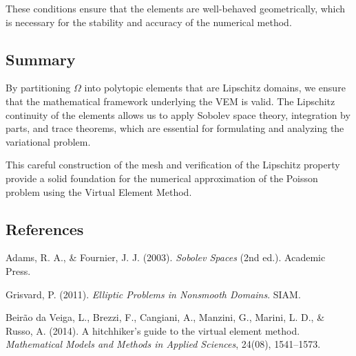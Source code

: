 \documentclass{article}
\begin{document}
These conditions ensure that the elements are well-behaved geometrically, which is necessary for the stability and accuracy of the numerical method.

\subsection{Summary}

By partitioning \( \Omega \) into polytopic elements that are Lipschitz domains, we ensure that the mathematical framework underlying the VEM is valid. The Lipschitz continuity of the elements allows us to apply Sobolev space theory, integration by parts, and trace theorems, which are essential for formulating and analyzing the variational problem.

This careful construction of the mesh and verification of the Lipschitz property provide a solid foundation for the numerical approximation of the Poisson problem using the Virtual Element Method.

\subsection{References}

\begin{thebibliography}{9}

Adams, R. A., \& Fournier, J. J. (2003). \textit{Sobolev Spaces} (2nd ed.). Academic Press.

Grisvard, P. (2011). \textit{Elliptic Problems in Nonsmooth Domains}. SIAM.

Beir{\~a}o da Veiga, L., Brezzi, F., Cangiani, A., Manzini, G., Marini, L. D., \& Russo, A. (2014). A hitchhiker's guide to the virtual element method. \textit{Mathematical Models and Methods in Applied Sciences}, 24(08), 1541--1573.

\end{thebibliography}
\end{document}
